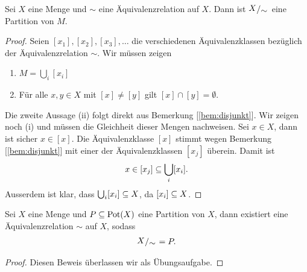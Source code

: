 
\begin{satz}
\label{satz:part}

  Sei $X$ eine Menge und $\sim$ eine Äquivalenzrelation auf $X$. Dann ist
  $\quotspace{X}{\sim}$ eine Partition von $M$.

  \begin{proof}

    Seien $[x_{1}],[x_{2}], [x_{3}], \dots$ die verschiedenen
    Äquivalenzklassen bezüglich der Äquivalenzrelation $\sim$. Wir müssen
    zeigen

    \begin{enumerate}
      \item $M = \bigcup_{i} [x_{i}]$
      \item Für alle $x,y \in X$ mit $[x]\neq [y]$ gilt $[x] \cap [y]
        = \emptyset$.
    \end{enumerate}

    Die zweite Aussage (ii) folgt direkt aus Bemerkung
    [\ref{bem:disjunkt}]. Wir zeigen noch (i) und müssen die Gleichheit
    dieser Mengen nachweisen. Sei $x\in X$, dann ist sicher $x\in [x]$. Die
    Äquivalenzklasse $[x]$ stimmt wegen Bemerkung [\ref{bem:disjunkt}] mit
    einer der Äquivalenzklassen $[x_{j}]$ überein. Damit ist
    \begin{align*}
      x\in [x_{j}] \subseteq \bigcup_{i} [x_{i}].
    \end{align*}
    Ausserdem ist klar, dass $\bigcup_{i}[x_{i}]
    \subseteq X$, da $[x_{i}]\subseteq X$.
    
  \end{proof}
 
\end{satz}


\begin{satz}

  Sei $X$ eine Menge und $P\subseteq \operatorname{Pot}(X)$ eine Partition von $X$, dann
  existiert eine Äquivalenzrelation $\sim$ auf $X$, sodass
  \begin{align*}
    \quotspace{X}{\sim} = P.
  \end{align*}

  \begin{proof}
    Diesen Beweis überlassen wir als Übungsaufgabe.
  \end{proof}
  
\end{satz}

